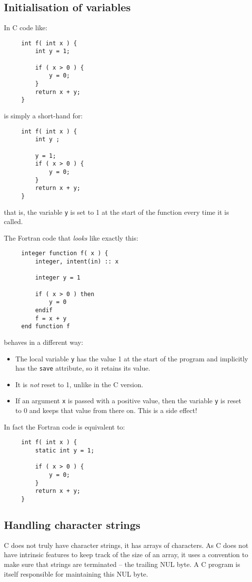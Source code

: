 \subsection{Initialisation of variables}
In C code like:
\begin{verbatim}
     int f( int x ) {
         int y = 1;

         if ( x > 0 ) {
             y = 0;
         }
         return x + y;
     }
\end{verbatim}

is simply a short-hand for:
\begin{verbatim}
     int f( int x ) {
         int y ;

         y = 1;
         if ( x > 0 ) {
             y = 0;
         }
         return x + y;
     }
\end{verbatim}

\noindent that is, the variable \verb+y+ is set to 1 at the start of the function every time it is
called.

The Fortran code that \emph{looks} like exactly this:
\begin{verbatim}
     integer function f( x ) {
         integer, intent(in) :: x

         integer y = 1

         if ( x > 0 ) then
             y = 0
         endif
         f = x + y
     end function f
\end{verbatim}
\noindent behaves in a different way:

\begin{itemize}
\item
The local variable \verb+y+ has the value 1 at the start of the program and implicitly has the \verb+save+ attribute,
so it retains its value.
\item
It is \emph{not} reset to 1, unlike in the C version.
\item
If an argument \verb+x+ is passed with a positive value, then the variable \verb+y+ is reset to 0 and keeps that
value from there on. This is a side effect!
\end{itemize}

In fact the Fortran code is equivalent to:
\begin{verbatim}
     int f( int x ) {
         static int y = 1;

         if ( x > 0 ) {
             y = 0;
         }
         return x + y;
     }
\end{verbatim}

\subsection{Handling character strings}
C does not truly have character strings, it has arrays of characters. As C does not have intrinsic
features to keep track of the size of an array, it uses a convention to make sure that strings
are terminated -- the trailing NUL byte. A C program is itself responsible for maintaining this
NUL byte.


